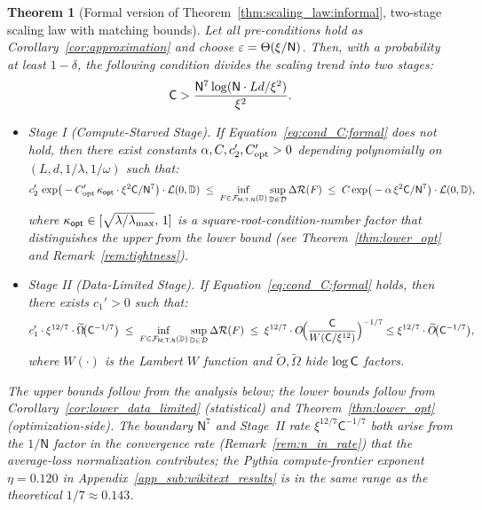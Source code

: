 \documentclass[11pt]{article}
\theoremstyle{plain}
\newtheorem{theorem}{Theorem}[section]
\newcommand{\wt}{\widetilde}
\begin{document}
\begin{theorem}[Formal version of Theorem~\ref{thm:scaling_law:informal}, two-stage scaling law with matching bounds]\label{thm:scaling_law}
    Let all pre-conditions hold as Corollary~\ref{cor:approximation} and choose $\varepsilon = \Theta(\xi/{\sf N})$. Then, with a probability at least $1 - \delta$, the following condition divides the scaling trend into two stages:
    \begin{align}\label{eq:cond_C:formal}
        {\sf C} > \frac{{\sf N}^7\log( {\sf N}  \cdot Ld/\xi^2)}{\xi^2}.
    \end{align}
    \begin{itemize}
        \item {\it Stage I (Compute-Starved Stage).} If Equation~\eqref{eq:cond_C:formal} does not hold, then there exist constants $\alpha,C,c_2',C_{\rm opt}'>0$ depending polynomially on $(L,d,1/\lambda,1/\omega)$ such that:
        \begin{align*}
            c_2'\,\exp\!\big(-C_{\rm opt}'\, \kappa_{\sf opt}\cdot \xi^2{\sf C}/{\sf N}^7\big)\cdot{\cal L}(0,\mathbb{D}) \;\le\;
            \inf_{F \in {\cal F}_{\sf M, T, N}(\mathbb{D})} \sup_{\mathbb{D} \in {\cal D}}  \Delta{\cal R}(F)
            \;\le\; C \exp\!\big(-\alpha\, \xi^2{\sf C}/{\sf N}^7\big) \cdot {\cal L}(0, \mathbb{D}),
        \end{align*}
        where $\kappa_{\sf opt}\in[\sqrt{\lambda/\lambda_{\max}},\,1]$ is a square-root-condition-number factor that distinguishes the upper from the lower bound (see Theorem~\ref{thm:lower_opt} and Remark~\ref{rem:tightness}).
        \item {\it Stage II (Data-Limited Stage).} If Equation~\eqref{eq:cond_C:formal} holds, then there exists $c_1'>0$ such that:
        \begin{align*}
            c_1'\cdot \xi^{12/7}\cdot \widetilde\Omega\!\big({\sf C}^{-1/7}\big)
            \;\le\;
            \inf_{F\in{\cal F}_{\sf M, T, N}(\mathbb{D})} \sup_{\mathbb{D} \in {\cal D}}  \Delta{\cal R}(F)
            \;\le\;
            \xi^{12/7} \cdot O\!\Big( \frac{{\sf C}}{W({\sf C}/\xi^{12})} \Big)^{-1/7} \le \xi^{12/7} \cdot \wt{O}\!\big({\sf C}^{-1/7}\big),
        \end{align*}
        where $W(\cdot)$ is the Lambert $W$ function and $\widetilde O,\widetilde \Omega$ hide $\log {\sf C}$ factors.
    \end{itemize}
    The upper bounds follow from the analysis below; the lower bounds follow from Corollary~\ref{cor:lower_data_limited} (statistical) and Theorem~\ref{thm:lower_opt} (optimization-side). The boundary $\mathsf{N}^7$ and Stage~II rate $\xi^{12/7}\mathsf{C}^{-1/7}$ both arise from the $1/\mathsf{N}$ factor in the convergence rate (Remark~\ref{rem:n_in_rate}) that the average-loss normalization contributes; the Pythia compute-frontier exponent $\eta=0.120$ in Appendix~\ref{app_sub:wikitext_results} is in the same range as the theoretical $1/7\approx 0.143$.
\end{theorem}
\end{document}
